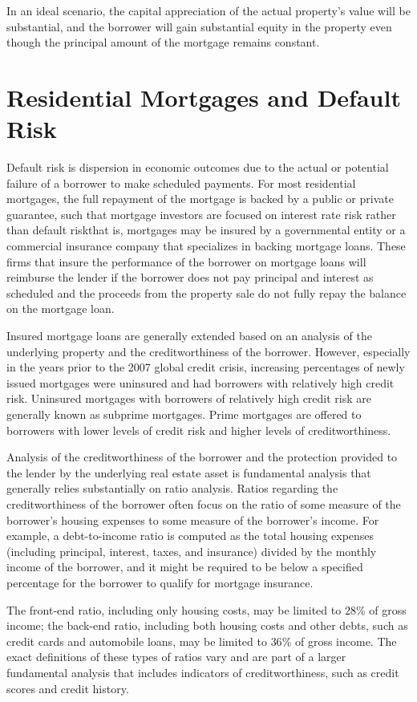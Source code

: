 \documentclass[11pt]{article}
\begin{document}
In an ideal scenario, the capital appreciation of the actual property's value will be substantial, and the borrower will gain substantial equity in the property even though the principal amount of the mortgage remains constant.

\section*{Residential Mortgages and Default Risk}
Default risk is dispersion in economic outcomes due to the actual or potential failure of a borrower to make scheduled payments. For most residential mortgages, the full repayment of the mortgage is backed by a public or private guarantee, such that mortgage investors are focused on interest rate risk rather than default riskthat is, mortgages may be insured by a governmental entity or a commercial insurance company that specializes in backing mortgage loans. These firms that insure the performance of the borrower on mortgage loans will reimburse the lender if the borrower does not pay principal and interest as scheduled and the proceeds from the property sale do not fully repay the balance on the mortgage loan.

Insured mortgage loans are generally extended based on an analysis of the underlying property and the creditworthiness of the borrower. However, especially in the years prior to the 2007 global credit crisis, increasing percentages of newly issued mortgages were uninsured and had borrowers with relatively high credit risk. Uninsured mortgages with borrowers of relatively high credit risk are generally known as subprime mortgages. Prime mortgages are offered to borrowers with lower levels of credit risk and higher levels of creditworthiness.

Analysis of the creditworthiness of the borrower and the protection provided to the lender by the underlying real estate asset is fundamental analysis that generally relies substantially on ratio analysis. Ratios regarding the creditworthiness of the borrower often focus on the ratio of some measure of the borrower's housing expenses to some measure of the borrower's income. For example, a debt-to-income ratio is computed as the total housing expenses (including principal, interest, taxes, and insurance) divided by the monthly income of the borrower, and it might be required to be below a specified percentage for the borrower to qualify for mortgage insurance.

The front-end ratio, including only housing costs, may be limited to $28 \%$ of gross income; the back-end ratio, including both housing costs and other debts, such as credit cards and automobile loans, may be limited to $36 \%$ of gross income. The exact definitions of these types of ratios vary and are part of a larger fundamental analysis that includes indicators of creditworthiness, such as credit scores and credit history.
\end{document}
